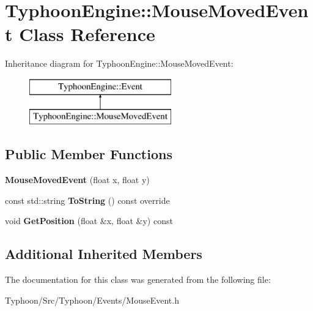 \hypertarget{class_typhoon_engine_1_1_mouse_moved_event}{}\section{Typhoon\+Engine\+::Mouse\+Moved\+Event Class Reference}
\label{class_typhoon_engine_1_1_mouse_moved_event}
Inheritance diagram for Typhoon\+Engine\+::Mouse\+Moved\+Event\+:\begin{figure}[H]
\begin{center}
\leavevmode
\includegraphics[height=2.000000cm]{class_typhoon_engine_1_1_mouse_moved_event}
\end{center}
\end{figure}
\subsection*{Public Member Functions}
\begin{DoxyCompactItemize}
\item 
\mbox{\label{class_typhoon_engine_1_1_mouse_moved_event_a01d10513364dfe5382cd672a4ef3b401}} 
{\bfseries Mouse\+Moved\+Event} (float x, float y)
\item 
\mbox{\label{class_typhoon_engine_1_1_mouse_moved_event_a415cf99a9b4325cc3fef78ffd7c1d2df}} 
const std\+::string {\bfseries To\+String} () const override
\item 
\mbox{\label{class_typhoon_engine_1_1_mouse_moved_event_aac2d9656a12c06f052c5364f3c8e8466}} 
void {\bfseries Get\+Position} (float \&x, float \&y) const
\end{DoxyCompactItemize}
\subsection*{Additional Inherited Members}


The documentation for this class was generated from the following file\+:\begin{DoxyCompactItemize}
\item 
Typhoon/\+Src/\+Typhoon/\+Events/Mouse\+Event.\+h\end{DoxyCompactItemize}
